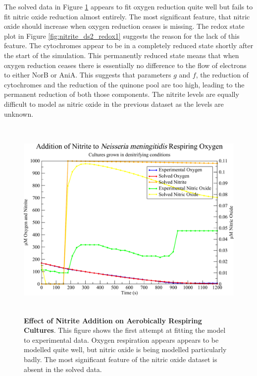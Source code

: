 The solved data in Figure \ref{fig:nitrite_ds2_solved1} appears to fit oxygen reduction quite well but fails to fit nitric oxide reduction almost entirely. The most significant feature, that nitric oxide should increase when oxygen reduction ceases is missing. The redox state plot in Figure \ref{fig:nitrite_ds2_redox1} suggests the reason for the lack of this feature. The cytochromes appear to be in a completely reduced state shortly after the start of the simulation. This permanently reduced state means that when oxygen reduction ceases there is essentially no difference to the flow of electrons to either NorB or AniA. This suggests that parameters $g$ and $f$, the reduction of cytochromes and the reduction of the quinone pool are too high, leading to the permanent reduction of both those components. The nitrite levels are equally difficult to model as nitric oxide in the previous dataset as the levels are unknown.

\begin{figure}[tbp]
 \centering
 \includegraphics[height=10cm, clip=true]{./07-nitritereduction/data/dataset2-1.pdf}
 \caption[Effect of Nitrite Addition on Aerobically Respiring Cultures]{{\bf Effect of Nitrite Addition on Aerobically Respiring Cultures}. This figure shows the first attempt at fitting the model to experimental data. Oxygen respiration appears appears to be modelled quite well, but nitric oxide is being modelled particularly badly. The most significant feature of the nitric oxide dataset is absent in the solved data.
  \label{fig:nitrite_ds2_solved1}}
\end{figure}


